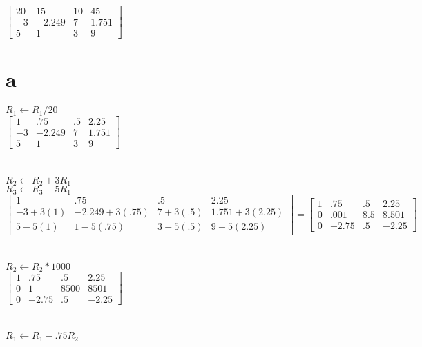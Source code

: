 \documentclass{article}
\begin{document}
\begin{center}
$\begin{bmatrix}
20 & 15 & 10 & 45 \\
-3 & -2.249 & 7 & 1.751 \\
5 & 1 & 3 & 9
\end{bmatrix}$

\end{center}

\section*{a}
    $R_1 \leftarrow R_1 / 20$\\
    $\begin{bmatrix}
        1 & .75 & .5 & 2.25 \\
        -3 & -2.249 & 7 & 1.751 \\
        5 & 1 & 3 & 9
    \end{bmatrix}$\\\\\\
    $R_2 \leftarrow R_2 + 3R_1$\\
    $R_3 \leftarrow R_3 - 5R_1$\\
    $\begin{bmatrix}
        1 & .75 & .5 & 2.25 \\
        -3 + 3(1) & -2.249 + 3(.75) & 7 + 3(.5) & 1.751 + 3(2.25) \\
        5 -5(1)& 1 -5(.75) & 3 -5(.5) & 9 - 5(2.25)
    \end{bmatrix} 
    =
    \begin{bmatrix}
        1 & .75 & .5 & 2.25 \\
        0 & .001 & 8.5 & 8.501 \\
        0 & -2.75 & .5 & -2.25
    \end{bmatrix}$\\\\\\
    $R_2 \leftarrow R_2 * 1000$\\
    $\begin{bmatrix}
        1 & .75 & .5 & 2.25 \\
        0 & 1 & 8500 & 8501 \\
        0 & -2.75 & .5 & -2.25
    \end{bmatrix}$\\\\\\
    $R_1 \leftarrow R_1 - .75R_2$\\
\end{document}
